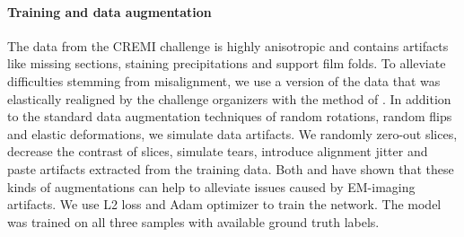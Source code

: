 \paragraph{Training and data augmentation} The data from the CREMI challenge is highly anisotropic and contains artifacts like missing sections, staining precipitations and support film folds. 
To alleviate difficulties stemming from misalignment, we use a version of the data that was elastically realigned by the challenge organizers with the method of \cite{saalfeld2012elastic}.
In addition to the standard data augmentation techniques of random rotations, random flips and  elastic deformations, we simulate data artifacts.
We randomly zero-out slices, decrease the contrast of slices, simulate tears, introduce alignment jitter and paste artifacts extracted from the training data. Both \cite{funke2018large} and \cite{lee2017superhuman} have shown
that these kinds of augmentations can help to alleviate issues caused by EM-imaging artifacts.
We use L2 loss and Adam optimizer to train the network. The model was trained on all three samples with available ground truth labels.  

